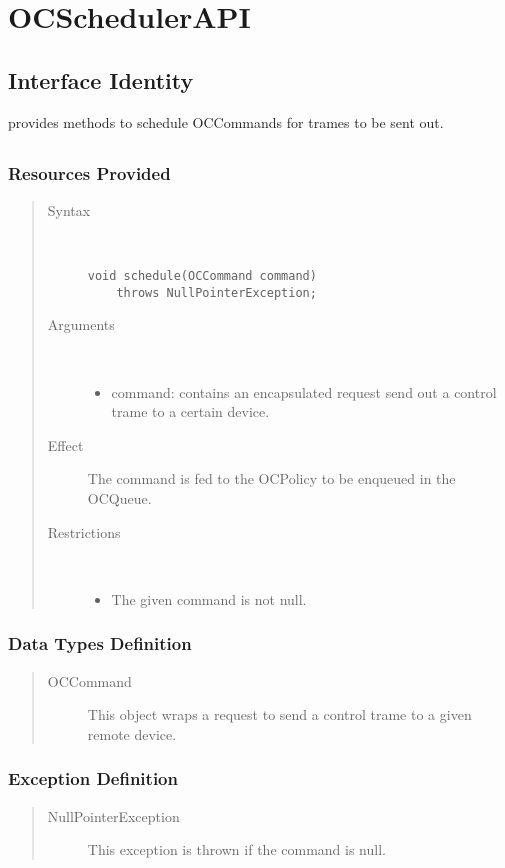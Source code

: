 \section{OCSchedulerAPI}
\label{api:oc-scheduler-api}

\subsection{Interface Identity}

\npar {} provides methods to schedule
OCCommands for trames to be sent out.

\subsection{}

\subsubsection{Resources Provided}

\begin{quote}
	\begin{description}
		\item[Syntax] \ 
		\begin{verbatim}
void schedule(OCCommand command)
    throws NullPointerException;
		\end{verbatim}
		\item[Arguments] \
		\begin{itemize}
			\item command: contains an encapsulated request send out a control trame to
			a certain device.
		\end{itemize}
		\item[Effect] The command is fed to the OCPolicy to be enqueued in the
		OCQueue.
		\item[Restrictions] \ 
		\begin{itemize}
			\item The given command is not null.
		\end{itemize}
	\end{description} 
\end{quote}

\subsubsection{Data Types Definition}

\begin{quote}
	\begin{description}
		\item[OCCommand] This object wraps a request to send a control
		trame to a given remote device.
	\end{description}
\end{quote}

\subsubsection{Exception Definition}

\begin{quote}
	\begin{description}
		\item[NullPointerException] This exception is thrown if the command is null.
	\end{description} 
\end{quote}